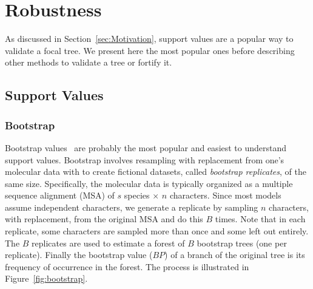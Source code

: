 \section{Robustness} \label{sec:robustness}

As discussed in Section~\ref{sec:Motivation}, support values are a popular way to validate a focal tree. We present here the most popular ones before describing other methods to validate a tree or fortify it. 

\subsection{Support Values} \label{sec:confidence-values}

\subsubsection{Bootstrap} \label{sec:bootstrap}

Bootstrap values~\cite{Felsenstein1985} are probably the most popular and easiest to understand support values. Bootstrap involves resampling with replacement from one's molecular data with to create fictional datasets, called \emph{bootstrap replicates}, of the same size. Specifically, the molecular data is typically organized as a multiple sequence alignment (MSA) of $s$ species $\times$ $n$ characters. Since most models assume independent characters, we generate a replicate by sampling $n$ characters, with replacement, from the original MSA and do this $B$ times. Note that in each replicate, some characters are sampled more than once and some left out entirely. The $B$ replicates are used to estimate a forest of $B$ bootstrap trees (one per replicate). Finally the bootstrap value ($BP$) of a branch of the original tree is its frequency of occurrence in the forest. The process is illustrated in Figure~\ref{fig:bootstrap}. 

